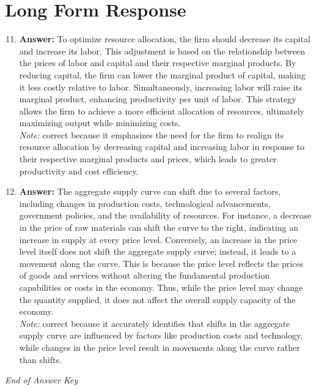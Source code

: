 \documentclass[12pt]{article}
\begin{document}
\section*{Long Form Response}
\begin{enumerate}[label=\arabic*.]
\setcounter{enumi}{10}
\item \textbf{Answer:} To optimize resource allocation, the firm should decrease its capital and increase its labor. This adjustment is based on the relationship between the prices of labor and capital and their respective marginal products. By reducing capital, the firm can lower the marginal product of capital, making it less costly relative to labor. Simultaneously, increasing labor will raise its marginal product, enhancing productivity per unit of labor. This strategy allows the firm to achieve a more efficient allocation of resources, ultimately maximizing output while minimizing costs.
\\ \textit{Note:} correct because it emphasizes the need for the firm to realign its resource allocation by decreasing capital and increasing labor in response to their respective marginal products and prices, which leads to greater productivity and cost efficiency.
\item \textbf{Answer:} The aggregate supply curve can shift due to several factors, including changes in production costs, technological advancements, government policies, and the availability of resources. For instance, a decrease in the price of raw materials can shift the curve to the right, indicating an increase in supply at every price level. Conversely, an increase in the price level itself does not shift the aggregate supply curve; instead, it leads to a movement along the curve. This is because the price level reflects the prices of goods and services without altering the fundamental production capabilities or costs in the economy. Thus, while the price level may change the quantity supplied, it does not affect the overall supply capacity of the economy.
\\ \textit{Note:} correct because it accurately identifies that shifts in the aggregate supply curve are influenced by factors like production costs and technology, while changes in the price level result in movements along the curve rather than shifts.
\end{enumerate}

\vfill
\noindent\textit{End of Answer Key}
\end{document}
